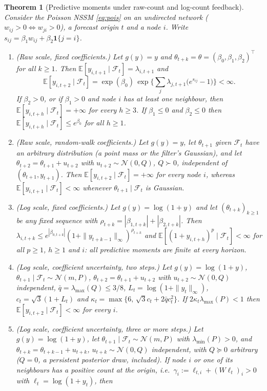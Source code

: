 \documentclass[12pt]{article}
\theoremstyle{plain}
\newtheorem{theorem}{Theorem}
\theoremstyle{definition}
\theoremstyle{remark}
\newcommand{\E}{\mathbb{E}}
\newcommand{\calF}{\mathcal{F}}
\newcommand{\calN}{\mathcal{N}}
\newcommand{\T}{^{\top}}
\begin{document}
\begin{theorem}[Predictive moments under raw-count and log-count feedback]\label{thm:poisson}
Consider the Poisson NSSM \eqref{eq:pois} on an undirected network \textup{(}$w_{ij}>0\Leftrightarrow w_{ji}>0$\textup{)}, a forecast origin $t$ and a node $i$. Write $s_{ij}=\beta_1w_{ij}+\beta_2\mathbf 1\{j=i\}$.
\begin{enumerate}[label=(\alph*),leftmargin=*]
\item \textup{(Raw scale, fixed coefficients.)} Let $g(y)=y$ and $\theta_{t+k}=\theta=(\beta_0,\beta_1,\beta_2)\T$ for all $k\ge1$. Then $\E[y_{i,t+1}\mid\calF_t]=\lambda_{i,t+1}$ and
\begin{equation}\label{eq:twostep}
\E[y_{i,t+2}\mid\calF_t]=\exp(\beta_0)\,\exp\Big\{\sum_{j}\lambda_{j,t+1}\big(e^{s_{ij}}-1\big)\Big\}<\infty .
\end{equation}
If $\beta_2>0$, or if $\beta_1>0$ and node $i$ has at least one neighbour, then $\E[y_{i,t+h}\mid\calF_t]=+\infty$ for every $h\ge3$. If $\beta_1\le0$ and $\beta_2\le0$ then $\E[y_{i,t+h}\mid\calF_t]\le e^{\beta_0}$ for all $h\ge1$.
\item \textup{(Raw scale, random-walk coefficients.)} Let $g(y)=y$, let $\theta_{t+1}$ given $\calF_t$ have an arbitrary distribution \textup{(}a point mass or the filter's Gaussian\textup{)}, and let $\theta_{t+2}=\theta_{t+1}+u_{t+2}$ with $u_{t+2}\sim\calN(0,Q)$, $Q\succ0$, independent of $(\theta_{t+1},y_{t+1})$. Then $\E[y_{i,t+2}\mid\calF_t]=+\infty$ for every node $i$, whereas $\E[y_{i,t+1}\mid\calF_t]<\infty$ whenever $\theta_{t+1}\mid\calF_t$ is Gaussian.
\item \textup{(Log scale, fixed coefficients.)} Let $g(y)=\log(1+y)$ and let $(\theta_{t+k})_{k\ge1}$ be any fixed sequence with $\rho_{t+k}=|\beta_{1,t+k}|+|\beta_{2,t+k}|$. Then $\lambda_{i,t+k}\le e^{|\beta_{0,t+k}|}(1+\|y_{t+k-1}\|_\infty)^{\rho_{t+k}}$ and $\E[(1+y_{i,t+h})^p\mid\calF_t]<\infty$ for all $p\ge1$, $h\ge1$ and $i$: all predictive moments are finite at every horizon.
\item \textup{(Log scale, coefficient uncertainty, two steps.)} Let $g(y)=\log(1+y)$, $\theta_{t+1}\mid\calF_t\sim\calN(m,P)$, $\theta_{t+2}=\theta_{t+1}+u_{t+2}$ with $u_{t+2}\sim\calN(0,Q)$ independent, $\bar q=\lambda_{\max}(Q)\le3/8$, $L_t=\log(1+\|y_t\|_\infty)$, $c_t=\sqrt3(1+L_t)$ and $\kappa_t=\max\{6,\,\sqrt3c_t+2\bar qc_t^2\}$. If $2\kappa_t\lambda_{\max}(P)<1$ then $\E[y_{i,t+2}\mid\calF_t]<\infty$ for every $i$.
\item \textup{(Log scale, coefficient uncertainty, three or more steps.)} Let $g(y)=\log(1+y)$, let $\theta_{t+1}\mid\calF_t\sim\calN(m,P)$ with $\lambda_{\min}(P)>0$, and $\theta_{t+k}=\theta_{t+k-1}+u_{t+k}$, $u_{t+k}\sim\calN(0,Q)$ independent, with $Q\succeq0$ arbitrary \textup{(}$Q=0$, a persistent posterior draw, included\textup{)}. If node $i$ or one of its neighbours has a positive count at the origin, i.e.\ $\gamma_i:=\ell_{t,i}+(W\ell_t)_i>0$ with $\ell_t=\log(1+y_t)$, then

\end{enumerate}
\end{theorem}
\end{document}
